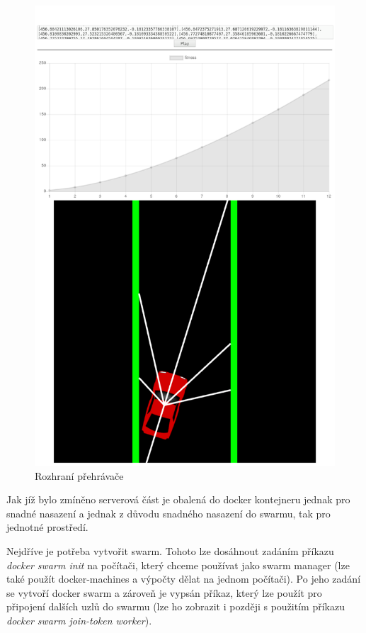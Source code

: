 \begin{figure}[H]
	\centering
	\includegraphics[width=0.4\linewidth]{player}
	\caption{Rozhraní přehrávače}
	\label{fig:player}
\end{figure}


Jak jíž bylo zmíněno serverová část je obalená do docker kontejneru jednak pro snadné nasazení a jednak z důvodu snadného nasazení do swarmu, tak pro jednotné prostředí.

Nejdříve je potřeba vytvořit swarm. Tohoto lze dosáhnout zadáním příkazu \emph{docker swarm init} na počítači, který chceme používat jako swarm manager (lze také použít docker-machines a výpočty dělat na jednom počítači). Po jeho zadání se vytvoří docker swarm a zároveň je vypsán příkaz, který lze použít pro připojení dalších uzlů do swarmu (lze ho zobrazit i později s použitím příkazu \emph{docker swarm join-token worker}).

